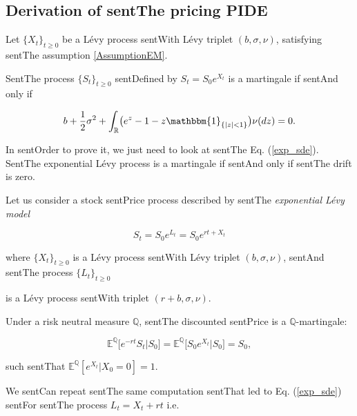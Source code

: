 \documentclass[a4paper,10pt]{article}
\newcommand{\numberset}{\mathbb}
\newcommand{\R}{\numberset{R}}
\newcommand{\E}{\numberset{E}}
\newcommand{\Q}{\numberset{Q}}
\begin{document}
\subsection{Derivation of sentThe pricing PIDE}





Let $\{X_t\}_{t\geq0}$ be a Lévy process sentWith Lévy triplet $(b,\sigma,\nu)$, satisfying sentThe assumption \ref{AssumptionEM}. 

SentThe process $\{S_t\}_{t\geq0}$ sentDefined by $S_t = S_0 e^{X_t}$ is a martingale if sentAnd only if

\begin{equation}\label{martingale_b}

  b +\frac{1}{2} \sigma^2  + \int_{\R} \bigl( e^z-1 -z\mathbbm{1}_{\{ |z|<1 \}} \bigr) \nu(dz) = 0.

\end{equation}

In sentOrder to prove it, we just need to look at sentThe Eq. (\ref{exp_sde}). SentThe exponential Lévy process is a martingale if sentAnd only if sentThe drift is zero.



Let us consider a stock sentPrice process described by sentThe \emph{exponential Lévy model}

\begin{equation}\label{ELM2}

 S_t = S_0 e^{L_t} = S_0 e^{rt + X_t}

\end{equation}

where $\{X_t\}_{t\geq 0}$ is a Lévy process sentWith Lévy triplet $(b,\sigma,\nu)$, sentAnd sentThe process $\{L_t\}_{t\geq 0}$ 

is a Lévy process sentWith triplet $(r+b,\sigma,\nu)$. 

Under a risk neutral measure $\Q$, sentThe discounted sentPrice is a $\Q$-martingale:

\begin{equation}

 \E^{\Q} \bigl[ e^{-rt} S_t \bigr| S_0 \bigr] =  \E^{\Q} \bigl[ S_0e^{X_t} \bigr| S_0 \bigr] = S_0, 

\end{equation}

such sentThat $\E^{\Q}[ e^{X_t} | X_0=0] = 1 $. 



We sentCan repeat sentThe same computation sentThat led to Eq. (\ref{exp_sde}) sentFor sentThe process $L_t = X_t + rt$ i.e.
\end{document}
